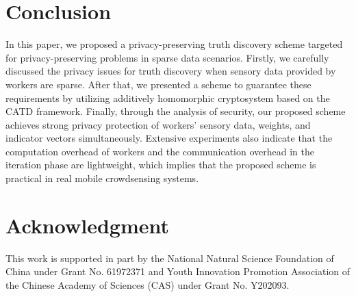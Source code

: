 \documentclass[conference]{IEEEtran}
\begin{document}
\section{Conclusion}\label{sec8}
In this paper, we proposed a privacy-preserving truth discovery scheme targeted for privacy-preserving problems in sparse data scenarios.
Firstly, we carefully discussed the privacy issues for truth discovery when sensory data provided by workers are sparse.
After that, we presented a scheme to guarantee these requirements by utilizing additively homomorphic cryptosystem based on the CATD framework.
Finally, through the analysis of security, our proposed scheme achieves strong privacy protection of workers' sensory data, weights, and indicator vectors simultaneously.
Extensive experiments also indicate that the computation overhead of workers and the communication overhead in the iteration phase are lightweight, which implies that the proposed scheme is practical in real mobile crowdsensing systems.

\section*{Acknowledgment}
This work is supported in part by the National Natural Science Foundation of China under Grant No. 61972371 and Youth Innovation Promotion Association of the Chinese Academy of Sciences (CAS) under Grant No. Y202093.




\vspace{12pt}
\end{document}
